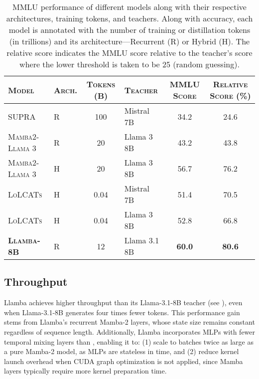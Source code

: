 \begin{table}[ht]
    \centering
    \begin{tabular}{l l c l c c}
        \toprule
        \textsc{Model} & \textsc{Arch.} & \textsc{Tokens (B)} & \textsc{Teacher} & \textsc{MMLU Score} & \textsc{Relative Score (\%)} \\
        \midrule
        \textsc{SUPRA} & R & 100 & Mistral 7B & 34.2 & 24.6 \\
        \textsc{Mamba2-Llama 3} & R & 20 & Llama 3 8B & 43.2 & 43.8 \\
        \textsc{Mamba2-Llama 3} & H & 20 & Llama 3 8B & 56.7 & 76.2 \\
        \textsc{LoLCATs} & H & 0.04 & Mistral 7B & 51.4 & 70.5 \\
        \textsc{LoLCATs} & H & 0.04 & Llama 3 8B & 52.8 & 66.8 \\
        \textbf{\textsc{Llamba-8B}} & R & 12 & Llama 3.1 8B & \textbf{60.0} & \textbf{80.6} \\
        \bottomrule
    \end{tabular}
    \caption{MMLU performance of different models along with their respective architectures, training tokens, and teachers.
    Along with accuracy, each model is annotated with the number of training or distillation tokens (in trillions) and its architecture—Recurrent (R)
    or Hybrid (H).
    The relative score indicates the MMLU score relative to the teacher's score where the lower threshold is taken    
    to be 25 (random guessing). 
    }
\label{tab:comparison_against_distillation_methods}
\end{table}
    
\subsection{Throughput}
\label{subsec:throughput}
Llamba achieves higher throughput than its Llama-3.1-8B teacher (see ), even when Llama-3.1-8B generates four times fewer tokens.
This performance gain stems from Llamba’s recurrent Mamba-2 layers, whose state size remains constant regardless of sequence length.
Additionally, Llamba incorporates MLPs with fewer temporal mixing layers than \citet{mamba2}, enabling it to:
(1) scale to batches twice as large as a pure Mamba-2 model, as MLPs are stateless in time, and
(2) reduce kernel launch overhead when CUDA graph optimization is not applied, since Mamba layers typically require more kernel preparation time.

